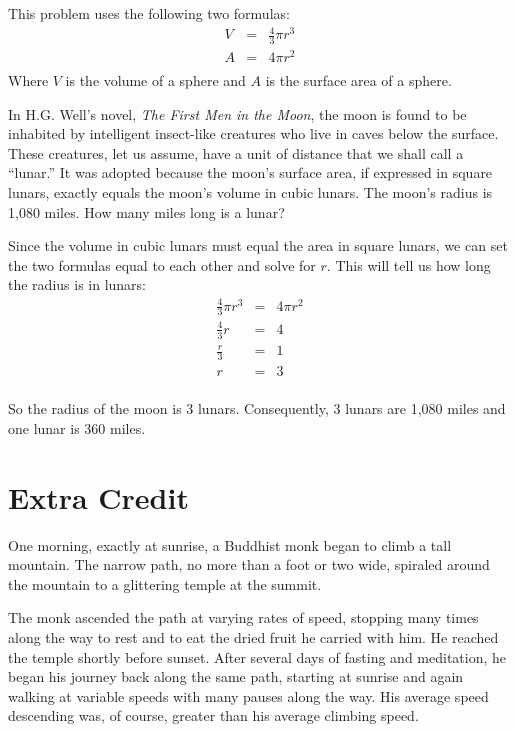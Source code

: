 \documentclass[letterpaper]{exam}
\begin{document}
\begin{questions}
\begin{solution}
    \end{solution}
    \question[]

    This problem uses the following two formulas:
    \begin{align*}
      V & = & \frac{4}{3} \pi r^3 \\
      A & = & 4 \pi r^2 \\
    \end{align*}
    Where $V$ is the volume of a sphere and $A$ is the surface area of a sphere.

    In H.G. Well's novel, {\em The First Men in the Moon}, the moon is found to be inhabited by intelligent
    insect-like creatures who live in caves below the surface.  These creatures, let us assume, have a unit of distance that we
    shall call a ``lunar.''  It was adopted because the moon's surface area, if expressed in square lunars, exactly equals
    the moon's volume in cubic lunars.  The moon's radius is 1,080 miles.  How many miles long is a lunar?

    \begin{solution}
    Since the volume in cubic lunars must equal the area in square lunars, we can set the two formulas equal to each other
    and solve for $r$.  This will tell us how long the radius is in lunars:
    \begin{align*}
      \frac{4}{3} \pi r^3 &=& 4 \pi r^2 \\
      \frac{4}{3} r &=& 4 \\
      \frac{r}{3} &=& 1 \\
      r &=& 3 \\
    \end{align*}

    So the radius of the moon is 3 lunars. Consequently, 3 lunars are 1,080 miles and one lunar is 360 miles.

    \end{solution}

    \pagebreak

    \section{Extra Credit}

    \question{}

    One morning, exactly at sunrise, a Buddhist monk began to climb a tall mountain.  The narrow path, no more than a foot
    or two wide, spiraled around the mountain to a glittering temple at the summit.

    The monk ascended the path at varying rates of speed, stopping many times along the way to rest and to eat the dried
    fruit he carried with him.  He reached the temple shortly before sunset.  After several days of fasting and meditation,
    he began his journey back along the same path, starting at sunrise and again walking at variable speeds with many pauses
    along the way.  His average speed descending was, of course, greater than his average climbing speed.


\end{questions}
\end{document}
